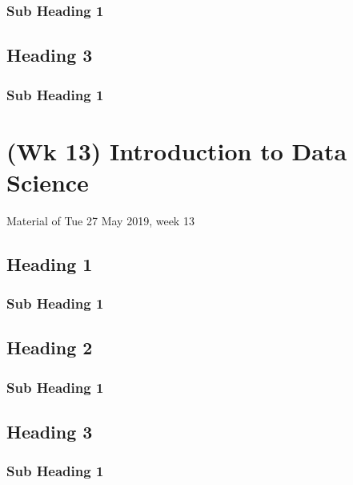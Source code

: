 \documentclass[]{book}
\begin{document}
\subsection{Sub Heading 1}\label{sub-heading-1-28}

\section{Heading 3}\label{heading-3-9}

\subsection{Sub Heading 1}\label{sub-heading-1-29}

\chapter{(Wk 13) Introduction to Data
Science}\label{wk-13-introduction-to-data-science}

Material of Tue 27 May 2019, week 13

\section{Heading 1}\label{heading-1-10}

\subsection{Sub Heading 1}\label{sub-heading-1-30}

\section{Heading 2}\label{heading-2-10}

\subsection{Sub Heading 1}\label{sub-heading-1-31}

\section{Heading 3}\label{heading-3-10}

\subsection{Sub Heading 1}\label{sub-heading-1-32}


\end{document}
